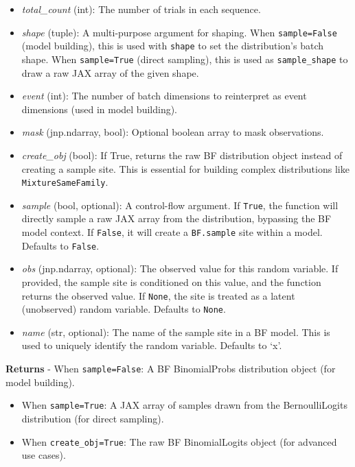 \documentclass[
  letterpaper,
  DIV=11,
  numbers=noendperiod]{scrartcl}
\begin{document}
\begin{itemize}
\item
  \emph{total\_count} (int): The number of trials in each sequence.
\item
  \emph{shape} (tuple): A multi-purpose argument for shaping. When
  \texttt{sample=False} (model building), this is used with
  \texttt{shape} to set the distribution's batch shape. When
  \texttt{sample=True} (direct sampling), this is used as
  \texttt{sample\_shape} to draw a raw JAX array of the given shape.
\item
  \emph{event} (int): The number of batch dimensions to reinterpret as
  event dimensions (used in model building).
\item
  \emph{mask} (jnp.ndarray, bool): Optional boolean array to mask
  observations.
\item
  \emph{create\_obj} (bool): If True, returns the raw BF distribution
  object instead of creating a sample site. This is essential for
  building complex distributions like \texttt{MixtureSameFamily}.
\item
  \emph{sample} (bool, optional): A control-flow argument. If
  \texttt{True}, the function will directly sample a raw JAX array from
  the distribution, bypassing the BF model context. If \texttt{False},
  it will create a \texttt{BF.sample} site within a model. Defaults to
  \texttt{False}.
\item
  \emph{obs} (jnp.ndarray, optional): The observed value for this random
  variable. If provided, the sample site is conditioned on this value,
  and the function returns the observed value. If \texttt{None}, the
  site is treated as a latent (unobserved) random variable. Defaults to
  \texttt{None}.
\item
  \emph{name} (str, optional): The name of the sample site in a BF
  model. This is used to uniquely identify the random variable. Defaults
  to `x'.
\end{itemize}

\textbf{Returns} - When \texttt{sample=False}: A BF BinomialProbs
distribution object (for model building).

\begin{itemize}
\item
  When \texttt{sample=True}: A JAX array of samples drawn from the
  BernoulliLogits distribution (for direct sampling).
\item
  When \texttt{create\_obj=True}: The raw BF BinomialLogits object (for
  advanced use cases).
\end{itemize}
\end{document}
